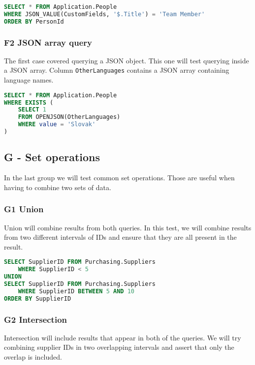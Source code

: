 \begin{lstlisting}[language=SQL]
SELECT * FROM Application.People
WHERE JSON_VALUE(CustomFields, '$.Title') = 'Team Member'
ORDER BY PersonId
\end{lstlisting}

\subsubsection*{F2 JSON array query}

The first case covered querying a JSON object. This one will test querying inside a JSON array. Column \texttt{OtherLanguages} contains a JSON array containing language names.

\begin{lstlisting}[language=SQL]
SELECT * FROM Application.People
WHERE EXISTS (
    SELECT 1
    FROM OPENJSON(OtherLanguages)
    WHERE value = 'Slovak'
)
\end{lstlisting}

\subsection{G - Set operations}

In the last group we will test common set operations. Those are useful when having to combine two sets of data.

\subsubsection*{G1 Union}

Union will combine results from both queries. In this test, we will combine results from two different intervals of IDs and ensure that they are all present in the result.

\begin{lstlisting}[language=SQL]
SELECT SupplierID FROM Purchasing.Suppliers 
    WHERE SupplierID < 5
UNION
SELECT SupplierID FROM Purchasing.Suppliers 
    WHERE SupplierID BETWEEN 5 AND 10
ORDER BY SupplierID
\end{lstlisting}

\subsubsection*{G2 Intersection}

Intersection will include results that appear in both of the queries. We will try combining supplier IDs in two overlapping intervals and assert that only the overlap is included. 

